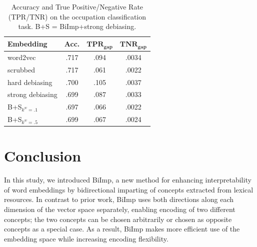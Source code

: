 \documentclass[11pt,a4paper]{article}
\def\proposedmethod{BiImp}
\begin{document}
\begin{table}
    \centering
	\begin{tabular}{lccc}
	    \hline \hline
        \textbf{Embedding} & \textbf{Acc.} & $\textbf{TPR}_{\textbf{gap}}$ & $\textbf{TNR}_{\textbf{gap}}$ \\\hline \hline %
        word2vec & .717 & .094 & .0034 \\
        scrubbed & .717 & .061 & .0022 \\
        hard debiasing & .700 & .105 & .0037 \\
        strong debiasing & .699 & .087 & .0033 \\
        B+S$_{k^w=.1}$ & .697 & .066 & .0022 \\
        B+S$_{k^w=.5}$ & .699 & .067 & .0024 \\
        \hline \hline
	\end{tabular}
	\caption{Accuracy and True Positive/Negative Rate
          (TPR/TNR) on the occupation classification
          task. B+S = \proposedmethod{}+strong debiasing.}
	\label{tab:biosbias}
\end{table}



\section{Conclusion} \label{sec:concl}

In this study, we introduced \proposedmethod{}, a new method for enhancing
interpretability of word embeddings by bidirectional
imparting of concepts extracted from lexical resources. 
In contrast to prior work, \proposedmethod{}
uses  both directions along each
dimension of the vector space separately, enabling encoding
of two different concepts; the two concepts can be chosen arbitrarily
or chosen as opposite concepts as a special case.  As a
result,
\proposedmethod{}
 makes more efficient use of
the embedding space while increasing encoding flexibility.

\end{document}

